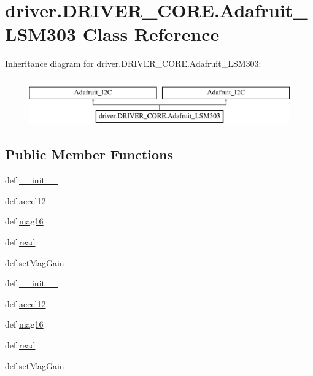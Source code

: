\hypertarget{classdriver_1_1DRIVER__CORE_1_1Adafruit__LSM303}{}\section{driver.\+D\+R\+I\+V\+E\+R\+\_\+\+C\+O\+R\+E.\+Adafruit\+\_\+\+L\+S\+M303 Class Reference}
\label{classdriver_1_1DRIVER__CORE_1_1Adafruit__LSM303}
Inheritance diagram for driver.\+D\+R\+I\+V\+E\+R\+\_\+\+C\+O\+R\+E.\+Adafruit\+\_\+\+L\+S\+M303\+:\begin{figure}[H]
\begin{center}
\leavevmode
\includegraphics[height=2.000000cm]{classdriver_1_1DRIVER__CORE_1_1Adafruit__LSM303}
\end{center}
\end{figure}
\subsection*{Public Member Functions}
\begin{DoxyCompactItemize}
\item 
def \hyperlink{classdriver_1_1DRIVER__CORE_1_1Adafruit__LSM303_ae5cf180d90f8866edaab4807bbe8f7bc}{\+\_\+\+\_\+init\+\_\+\+\_\+}
\item 
def \hyperlink{classdriver_1_1DRIVER__CORE_1_1Adafruit__LSM303_a73f30f042346b5134d46ac40ea05287c}{accel12}
\item 
def \hyperlink{classdriver_1_1DRIVER__CORE_1_1Adafruit__LSM303_a14da193d80d260f4d95a2636067685ce}{mag16}
\item 
def \hyperlink{classdriver_1_1DRIVER__CORE_1_1Adafruit__LSM303_a120ac3815a90e0b4ff49ae60958d568c}{read}
\item 
def \hyperlink{classdriver_1_1DRIVER__CORE_1_1Adafruit__LSM303_a91452cc4c7ef0ab07e886843e1cc90dd}{set\+Mag\+Gain}
\item 
def \hyperlink{classdriver_1_1DRIVER__CORE_1_1Adafruit__LSM303_ae5cf180d90f8866edaab4807bbe8f7bc}{\+\_\+\+\_\+init\+\_\+\+\_\+}
\item 
def \hyperlink{classdriver_1_1DRIVER__CORE_1_1Adafruit__LSM303_a73f30f042346b5134d46ac40ea05287c}{accel12}
\item 
def \hyperlink{classdriver_1_1DRIVER__CORE_1_1Adafruit__LSM303_a14da193d80d260f4d95a2636067685ce}{mag16}
\item 
def \hyperlink{classdriver_1_1DRIVER__CORE_1_1Adafruit__LSM303_a120ac3815a90e0b4ff49ae60958d568c}{read}
\item 
def \hyperlink{classdriver_1_1DRIVER__CORE_1_1Adafruit__LSM303_a91452cc4c7ef0ab07e886843e1cc90dd}{set\+Mag\+Gain}
\end{DoxyCompactItemize}
